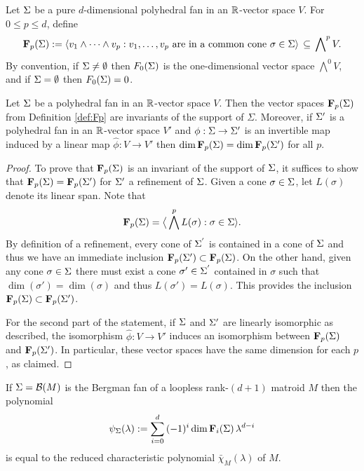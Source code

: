 \begin{defi}\label{def:Fp}
Let $\Sigma$ be a pure $d$-dimensional polyhedral fan in an ${\mathbb R}$-vector space $V$. 
For $0\leq p\leq d$, define 
\[{\mathbf F}_p(\Sigma) := \langle v_1 \wedge \dots \wedge v_p : v_1, \dotsc , v_p \text{ are in a common cone } \sigma \in \Sigma \rangle \, \subseteq  \, \bigwedge\nolimits^p V.\]
By convention, if $\Sigma \neq \emptyset$ then $F_0(\Sigma)$ is the one-dimensional vector space $\bigwedge\nolimits^0 V$, and if $\Sigma = \emptyset$ then $F_0(\Sigma) = 0$. 
\end{defi}

\begin{lemma}\label{lem:invarianceFp}
Let $\Sigma$ be a polyhedral fan in an ${\mathbb R}$-vector space $V$. Then the vector spaces ${\mathbf F}_p(\Sigma)$ from Definition \ref{def:Fp} are invariants of the support of $\Sigma$. 
Moreover, if $\Sigma'$ is a polyhedral fan in an ${\mathbb R}$-vector space $V'$ and $\phi: \Sigma \to \Sigma'$
is an invertible map induced by a linear map $\hat{\phi}: V \to V'$ then $\dim {\mathbf F}_p(\Sigma) = \dim {\mathbf F}_p(\Sigma')$ for all $p$. 
\end{lemma}

\begin{proof}
To prove that ${\mathbf F}_p(\Sigma)$ is an invariant of the support of $\Sigma$, it suffices to show that ${\mathbf F}_p(\Sigma) = {\mathbf F}_p(\Sigma')$ for $\Sigma'$ a refinement of $\Sigma$. Given a cone $\sigma \in \Sigma$, let $L(\sigma)$ denote its linear span. Note that
$${\mathbf F}_p(\Sigma) = \big \langle \bigwedge  ^p L(\sigma) : \sigma \in \Sigma \rangle.$$
By definition of a refinement, every cone of $\Sigma^{'}$ is contained in a cone of $\Sigma$ and thus we have an immediate inclusion ${\mathbf F}_p(\Sigma') \subset {\mathbf F}_p(\Sigma)$. 
On the other hand, given any cone $\sigma \in \Sigma$ there must exist a cone $\sigma' \in \Sigma^{'}$ contained in $\sigma$ such that $\dim(\sigma') = \dim(\sigma)$ and thus $L(\sigma') = L(\sigma)$.
This provides the inclusion ${\mathbf F}_p(\Sigma) \subset {\mathbf F}_p(\Sigma')$. 

For the second part of the statement, 
if $\Sigma$ and $\Sigma'$ are linearly isomorphic as described, the isomorphism $\hat{\phi}: V \to V'$ induces an isomorphism between ${\mathbf F}_p(\Sigma) $ and ${\mathbf F}_p(\Sigma')$. In particular, these vector spaces have the same dimension for each $p$, as claimed. 
\end{proof}

\begin{prop}\label{prop:charOS}
If $\Sigma = {\mathcal B}(M)$
is the Bergman fan of a loopless rank-$(d+1)$ matroid $M$ then the polynomial
\[{\psi}_{\Sigma}(\lambda) := \sum_{i=0}^d \, (-1)^{i} \dim {\mathbf F}_{i}(\Sigma) \, \lambda^{d-i}\]
is equal to the reduced characteristic polynomial $\bar \chi_M(\lambda)$ of $M$.
\end{prop}

